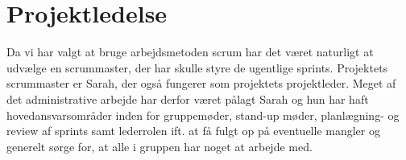 \vspace{0.3 cm}
\section{Projektledelse}
Da vi har valgt at bruge arbejdsmetoden scrum har det været naturligt at udvælge en scrummaster, der har skulle styre de ugentlige sprints. Projektets scrummaster er Sarah, der også fungerer som projektets projektleder. Meget af det administrative arbejde har derfor været pålagt Sarah og hun har haft hovedansvarsområder inden for gruppemøder, stand-up møder, planlægning- og review af sprints samt lederrolen ift. at få fulgt op på eventuelle mangler og generelt sørge for, at alle i gruppen har noget at arbejde med.

\vspace{0.3 cm}